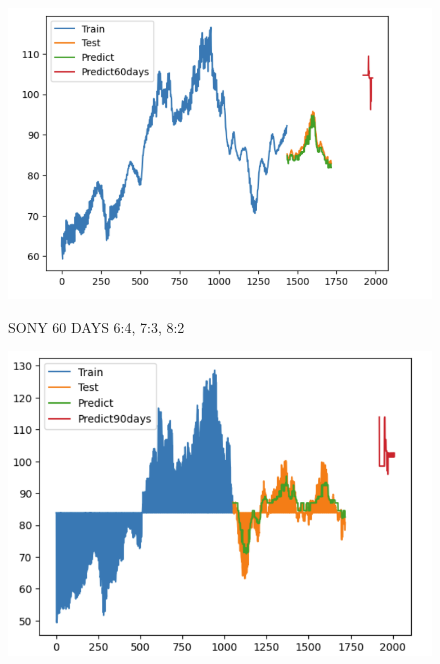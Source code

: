 \documentclass{article}
\begin{document}
\begin{multicols}{2}
\begin{figure}[H]
\begin{minipage}{0.15\textwidth}
    \label{fig:2}
    \end{minipage}%
    \begin{minipage}{0.15\textwidth}
    \centering
    \includegraphics[width=1\textwidth]{Image/Light GBM/Sn_8_2_60.png}

    \label{fig:3}
    \end{minipage}
    \caption{SONY 60 DAYS  6:4, 7:3, 8:2 }
\end{figure}


\begin{figure}[H]
    \centering
    \begin{minipage}{0.15\textwidth}
    \centering
    \includegraphics[width=1\textwidth]{Image/Light GBM/SN_6_4_90.png}
   

\end{minipage}
\end{figure}
\end{multicols}
\end{document}
